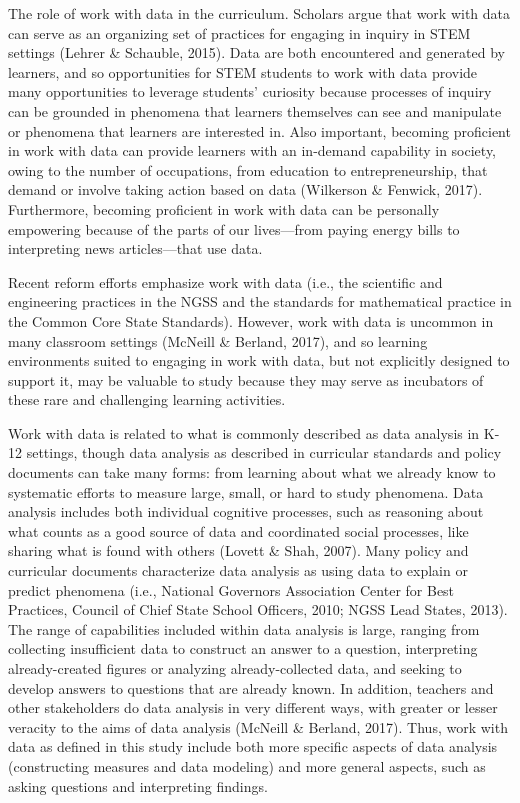 \documentclass[]{msu-thesis}
\theoremstyle{definition}
\theoremstyle{definition}
\theoremstyle{definition}
\theoremstyle{remark}
\begin{document}
The role of work with data in the curriculum. Scholars argue that work
with data can serve as an organizing set of practices for engaging in
inquiry in STEM settings (Lehrer \& Schauble, 2015). Data are both
encountered and generated by learners, and so opportunities for STEM
students to work with data provide many opportunities to leverage
students' curiosity because processes of inquiry can be grounded in
phenomena that learners themselves can see and manipulate or phenomena
that learners are interested in. Also important, becoming proficient in
work with data can provide learners with an in-demand capability in
society, owing to the number of occupations, from education to
entrepreneurship, that demand or involve taking action based on data
(Wilkerson \& Fenwick, 2017). Furthermore, becoming proficient in work
with data can be personally empowering because of the parts of our
lives---from paying energy bills to interpreting news articles---that
use data.

Recent reform efforts emphasize work with data (i.e., the scientific and
engineering practices in the NGSS and the standards for mathematical
practice in the Common Core State Standards). However, work with data is
uncommon in many classroom settings (McNeill \& Berland, 2017), and so
learning environments suited to engaging in work with data, but not
explicitly designed to support it, may be valuable to study because they
may serve as incubators of these rare and challenging learning
activities.

Work with data is related to what is commonly described as data analysis
in K-12 settings, though data analysis as described in curricular
standards and policy documents can take many forms: from learning about
what we already know to systematic efforts to measure large, small, or
hard to study phenomena. Data analysis includes both individual
cognitive processes, such as reasoning about what counts as a good
source of data and coordinated social processes, like sharing what is
found with others (Lovett \& Shah, 2007). Many policy and curricular
documents characterize data analysis as using data to explain or predict
phenomena (i.e., National Governors Association Center for Best
Practices, Council of Chief State School Officers, 2010; NGSS Lead
States, 2013). The range of capabilities included within data analysis
is large, ranging from collecting insufficient data to construct an
answer to a question, interpreting already-created figures or analyzing
already-collected data, and seeking to develop answers to questions that
are already known. In addition, teachers and other stakeholders do data
analysis in very different ways, with greater or lesser veracity to the
aims of data analysis (McNeill \& Berland, 2017). Thus, work with data
as defined in this study include both more specific aspects of data
analysis (constructing measures and data modeling) and more general
aspects, such as asking questions and interpreting findings.
\end{document}
